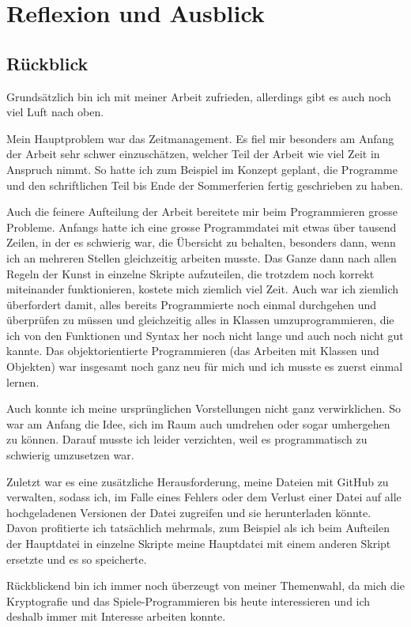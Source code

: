\section{Reflexion und Ausblick}
\subsection{Rückblick}
Grundsätzlich bin ich mit meiner Arbeit zufrieden, allerdings gibt es auch noch viel Luft nach oben.

Mein Hauptproblem war das Zeitmanagement. Es fiel mir besonders am Anfang der Arbeit sehr schwer einzuschätzen, welcher Teil der Arbeit wie viel Zeit in Anspruch nimmt. So hatte ich zum Beispiel im Konzept geplant, die Programme und den schriftlichen Teil bis Ende der Sommerferien fertig geschrieben zu haben.

Auch die feinere Aufteilung der Arbeit bereitete mir beim Programmieren grosse Probleme. Anfangs hatte ich eine grosse Programmdatei mit etwas über tausend Zeilen, in der es schwierig war, die Übersicht zu behalten, besonders dann, wenn ich an mehreren Stellen gleichzeitig arbeiten musste. Das Ganze dann nach allen Regeln der Kunst in einzelne Skripte aufzuteilen, die trotzdem noch korrekt miteinander funktionieren, kostete mich ziemlich viel Zeit. Auch war ich ziemlich überfordert damit, alles bereits Programmierte noch einmal durchgehen und überprüfen zu müssen und gleichzeitig alles in Klassen umzuprogrammieren, die ich von den Funktionen und Syntax her noch nicht lange und auch noch nicht gut kannte. Das objektorientierte Programmieren (das Arbeiten mit Klassen und Objekten) war insgesamt noch ganz neu für mich und ich musste es zuerst einmal lernen.

Auch konnte ich meine ursprünglichen Vorstellungen nicht ganz verwirklichen. So war am Anfang die Idee, sich im Raum auch umdrehen oder sogar umhergehen zu können. Darauf musste ich leider verzichten, weil es programmatisch zu schwierig umzusetzen war.

Zuletzt war es eine zusätzliche Herausforderung, meine Dateien mit GitHub zu verwalten, sodass ich, im Falle eines Fehlers oder dem Verlust einer Datei auf alle hochgeladenen Versionen der Datei zugreifen und sie herunterladen könnte. Davon profitierte ich tatsächlich mehrmals, zum Beispiel als ich beim Aufteilen der Hauptdatei in einzelne Skripte meine Hauptdatei mit einem anderen Skript ersetzte und es so speicherte.

Rückblickend bin ich immer noch überzeugt von meiner Themenwahl, da mich die Kryptografie und das Spiele-Programmieren bis heute interessieren und ich deshalb immer mit Interesse arbeiten konnte.

